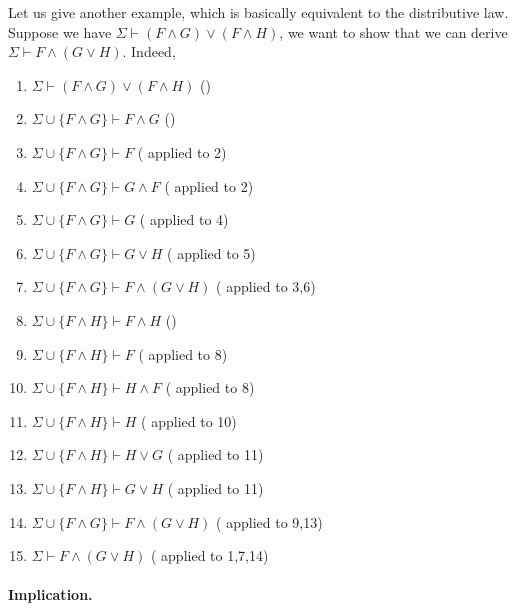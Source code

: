 Let us give another example, which is basically equivalent to the distributive law. Suppose we have $\Sigma\vdash (F\wedge G)\vee(F\wedge H)$, we want to show that we can derive $\Sigma\vdash F\wedge(G\vee H)$. Indeed,
\begin{enumerate}
	\item $\Sigma\vdash (F\wedge G)\vee(F\wedge H)$ \hfill ()%
	
	\item $\Sigma\cup\{F\wedge G\} \vdash F\wedge G$ \hfill ()%
	\item $\Sigma\cup\{F\wedge G\} \vdash F$ \hfill ( applied to 2)%
	\item $\Sigma\cup\{F\wedge G\} \vdash G\wedge F$ \hfill ( applied to 2)%
	\item $\Sigma\cup\{F\wedge G\} \vdash G$ \hfill ( applied to 4)%
	\item $\Sigma\cup\{F\wedge G\}\vdash G\vee H$ \hfill ( applied to 5)%
	\item $\Sigma\cup\{F\wedge G\}\vdash F\wedge(G\vee H)$ \hfill ( applied to 3,6)%

	\item $\Sigma\cup\{F\wedge H\} \vdash F\wedge H$ \hfill ()%
	\item $\Sigma\cup\{F\wedge H\} \vdash F$ \hfill ( applied to 8)%
	\item $\Sigma\cup\{F\wedge H\} \vdash H\wedge F$ \hfill ( applied to 8)%
	\item $\Sigma\cup\{F\wedge H\} \vdash H$ \hfill ( applied to 10)%
	\item $\Sigma\cup\{F\wedge H\}\vdash H\vee G$ \hfill ( applied to 11)%
	\item $\Sigma\cup\{F\wedge H\}\vdash G\vee H$ \hfill ( applied to 11)%
	\item $\Sigma\cup\{F\wedge G\}\vdash F\wedge(G\vee H)$ \hfill ( applied to 9,13)%

	\item $\Sigma\vdash F\wedge(G\vee H)$ \hfill ( applied to 1,7,14)%
\end{enumerate}

\paragraph{Implication.}


